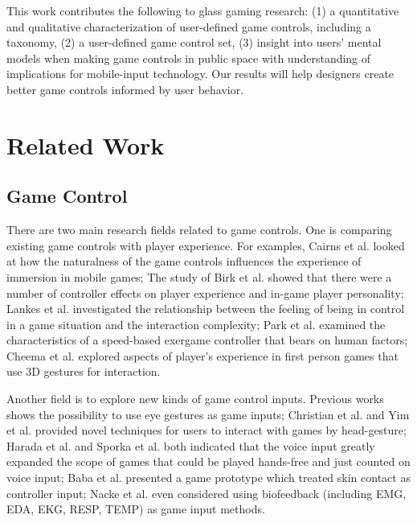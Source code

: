 \documentclass{sigchi}
\begin{document}
This work contributes the following to glass gaming research: 
(1) a quantitative and qualitative characterization of user-defined game controls, including a taxonomy, 
(2) a user-defined game control set, 
(3) insight into users' mental models when making game controls in public space with understanding of implications for mobile-input technology. 
Our results will help designers create better game controls informed by user behavior.





\section{Related Work}

    \subsection{Game Control}
    There are two main research fields related to game controls. One is comparing existing game controls with player experience. For examples, Cairns et al.\cite{Cairns:2014:ICI:2556288.2557345} looked at how the naturalness of the game controls influences the experience of immersion in mobile games; The study of Birk et al.\cite{Birk:2013:CYG:2470654.2470752} showed that there were a number of controller effects on player experience and in-game player personality; Lankes et al.\cite{Lankes:2012:CVC:2367616.2367629} investigated the relationship between the feeling of being in control in a game situation and the interaction complexity; Park et al.\cite{Park:2014:HFS:2556288.2557091} examined the characteristics of a speed-based exergame controller that bears on human factors; Cheema et al.\cite{Cheema:2011:WWT:2159365.2159407} explored aspects of player's experience in first person games that use 3D gestures for interaction.

    Another field is to explore new kinds of game control inputs. Previous works\cite{Ekman:2008:IEU:1358628.1358820,Vickers:2013:PLT:2531922.2514856,Sundstedt:2010:GGU:1837101.1837106,Smith:2006:UEM:1178823.1178847} shows the possibility to use eye gestures as game inputs; Christian et al.\cite{Christian:2014:VSI:2559206.2580103} and Yim et al.\cite{Yim:2008:EDD:1496984.1497033} provided novel techniques for users to interact with games by head-gesture; Harada et al.\cite{Harada:2011:VGI:2042053.2042059} and Sporka et al. \cite{Sporka:2006:NIS:1168987.1169023} both indicated that the voice input greatly expanded the scope of games that could be played hands-free and just counted on voice input; Baba et al.\cite{Baba:2007:VGU:1278280.1278285} presented a game prototype which treated skin contact as controller input; Nacke et al.\cite{Nacke:2011:BGD:1978942.1978958} even considered using biofeedback (including EMG, EDA, EKG, RESP, TEMP) as game input methods.
\end{document}
